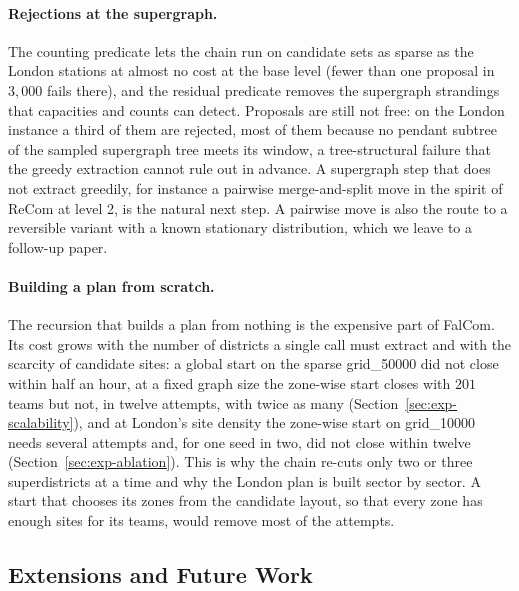 \documentclass[11pt]{article}
\theoremstyle{definition}
\begin{document}
\paragraph{Rejections at the supergraph.}
The counting predicate lets the chain run on candidate sets as sparse as
the London stations at almost no cost at the base level (fewer than one proposal in $3{,}000$ fails there), and the residual predicate removes the
supergraph strandings that capacities and counts can detect. Proposals
are still not free: on the London instance a third of them are
rejected, most of them because no pendant subtree of the sampled supergraph
tree meets its window, a tree-structural failure that the greedy
extraction cannot rule out in advance. A supergraph step that does not
extract greedily, for instance a pairwise merge-and-split move in the spirit of ReCom at level 2, is the natural next step. A pairwise move is also the route to a reversible variant with a known stationary distribution, which we leave to a follow-up paper.


\paragraph{Building a plan from scratch.}
The recursion that builds a plan from nothing is the expensive part of FalCom. Its cost grows with the number of districts a single call must extract and with the scarcity of candidate sites: a global start on the sparse grid\_50000 did not close within half an hour, at a fixed graph size the zone-wise start closes with $201$ teams but not, in twelve attempts, with twice as many (Section~\ref{sec:exp-scalability}), and at London's site density the zone-wise start on grid\_10000 needs several attempts and, for one seed in two, did not close within twelve (Section~\ref{sec:exp-ablation}). This is why the chain re-cuts only two or three superdistricts at a time and why the London plan is built sector by sector. A start that chooses its zones from the candidate layout, so that every zone has enough sites for its teams, would remove most of the attempts.

\subsection{Extensions and Future Work}
\label{sec:extensions}\label{sec:future}
\end{document}
